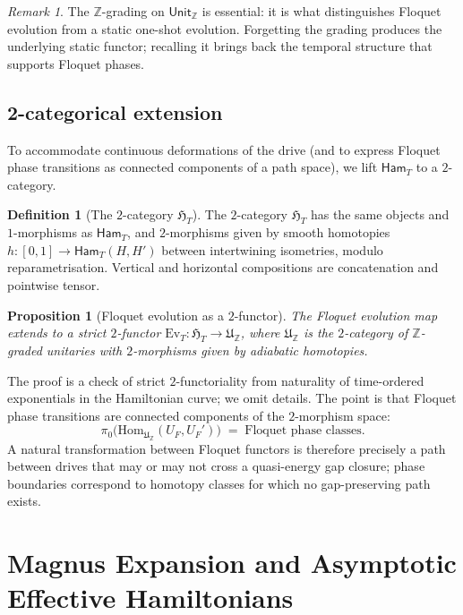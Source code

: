 \documentclass[12pt]{article}
\newtheorem{proposition}[theorem]{Proposition}
\theoremstyle{definition}
\newtheorem{definition}[theorem]{Definition}
\theoremstyle{remark}
\newtheorem{remark}[theorem]{Remark}
\newcommand{\Z}{\mathbb{Z}}
\newcommand{\Ham}{\mathsf{Ham}}
\begin{document}
\begin{remark}
The $\Z$-grading on $\mathsf{Unit}_{\Z}$ is essential: it is what distinguishes Floquet evolution from a static one-shot evolution. Forgetting the grading produces the underlying static functor; recalling it brings back the temporal structure that supports Floquet phases.
\end{remark}

\subsection{2-categorical extension}

To accommodate continuous deformations of the drive (and to express Floquet phase transitions as connected components of a path space), we lift $\Ham_T$ to a $2$-category.

\begin{definition}[The $2$-category $\mathfrak{H}_T$]
\label{def:2cat-Ham}
The $2$-category $\mathfrak{H}_T$ has the same objects and $1$-morphisms as $\Ham_T$, and $2$-morphisms given by smooth homotopies $h\colon[0,1]\to\Ham_T(H,H')$ between intertwining isometries, modulo reparametrisation. Vertical and horizontal compositions are concatenation and pointwise tensor.
\end{definition}

\begin{proposition}[Floquet evolution as a $2$-functor]
\label{prop:2-floquet}
The Floquet evolution map extends to a strict $2$-functor $\mathrm{Ev}_T\colon\mathfrak{H}_T\to\mathfrak{U}_{\Z}$, where $\mathfrak{U}_{\Z}$ is the $2$-category of $\Z$-graded unitaries with $2$-morphisms given by adiabatic homotopies.
\end{proposition}

The proof is a check of strict $2$-functoriality from naturality of time-ordered exponentials in the Hamiltonian curve; we omit details. The point is that Floquet phase transitions are connected components of the $2$-morphism space:
\begin{equation}
\pi_0\bigl(\mathrm{Hom}_{\mathfrak{U}_{\Z}}(U_F,U_F')\bigr) \;=\; \text{Floquet phase classes}.
\end{equation}
A natural transformation between Floquet functors is therefore precisely a path between drives that may or may not cross a quasi-energy gap closure; phase boundaries correspond to homotopy classes for which no gap-preserving path exists.

\section{Magnus Expansion and Asymptotic Effective Hamiltonians}
\label{sec:magnus}
\end{document}
